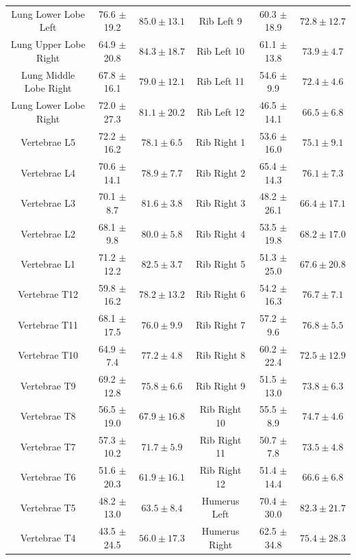 \begin{table}[t!]
{{\begin{tabular}{cccccc}
Lung Lower Lobe Left & 76.6 $\pm$ 19.2 & $\bm{85.0 \pm 13.1}$ & Rib Left 9 & 60.3 $\pm$ 18.9 & $\bm{72.8 \pm 12.7}$ \\
Lung Upper Lobe Right & 64.9 $\pm$ 20.8 & $\bm{84.3 \pm 18.7}$ & Rib Left 10 & 61.1 $\pm$ 13.8 & $\bm{73.9 \pm 4.7}$ \\
Lung Middle Lobe Right & 67.8 $\pm$ 16.1 & $\bm{79.0 \pm 12.1}$ & Rib Left 11 & 54.6 $\pm$ 9.9 & $\bm{72.4 \pm 4.6}$ \\
Lung Lower Lobe Right & 72.0 $\pm$ 27.3 & $\bm{81.1 \pm 20.2}$ & Rib Left 12 & 46.5 $\pm$ 14.1 & $\bm{66.5 \pm 6.8}$ \\
Vertebrae L5 & 72.2 $\pm$ 16.2 & $\bm{78.1 \pm 6.5}$ & Rib Right 1 & 53.6 $\pm$ 16.0 & $\bm{75.1 \pm 9.1}$ \\
Vertebrae L4 & 70.6 $\pm$ 14.1 & $\bm{78.9 \pm 7.7}$ & Rib Right 2 & 65.4 $\pm$ 14.3 & $\bm{76.1 \pm 7.3}$ \\
Vertebrae L3 & 70.1 $\pm$ 8.7 & $\bm{81.6 \pm 3.8}$ & Rib Right 3 & 48.2 $\pm$ 26.1 & $\bm{66.4 \pm 17.1}$ \\
Vertebrae L2 & 68.1 $\pm$ 9.8 & $\bm{80.0 \pm 5.8}$ & Rib Right 4 & 53.5 $\pm$ 19.8 & $\bm{68.2 \pm 17.0}$ \\
Vertebrae L1 & 71.2 $\pm$ 12.2 & $\bm{82.5 \pm 3.7}$ & Rib Right 5 & 51.3 $\pm$ 25.0 & $\bm{67.6 \pm 20.8}$ \\
Vertebrae T12 & 59.8 $\pm$ 16.2 & $\bm{78.2 \pm 13.2}$ & Rib Right 6 & 54.2 $\pm$ 16.3 & $\bm{76.7 \pm 7.1}$ \\
Vertebrae T11 & 68.1 $\pm$ 17.5 & $\bm{76.0 \pm 9.9}$ & Rib Right 7 & 57.2 $\pm$ 9.6 & $\bm{76.8 \pm 5.5}$ \\
Vertebrae T10 & 64.9 $\pm$ 7.4 & $\bm{77.2 \pm 4.8}$ & Rib Right 8 & 60.2 $\pm$ 22.4 & $\bm{72.5 \pm 12.9}$ \\
Vertebrae T9 & 69.2 $\pm$ 12.8 & $\bm{75.8 \pm 6.6}$ & Rib Right 9 & 51.5 $\pm$ 13.0 & $\bm{73.8 \pm 6.3}$ \\
Vertebrae T8 & 56.5 $\pm$ 19.0 & $\bm{67.9 \pm 16.8}$ & Rib Right 10 & 55.5 $\pm$ 8.9 & $\bm{74.7 \pm 4.6}$ \\
Vertebrae T7 & 57.3 $\pm$ 10.2 & $\bm{71.7 \pm 5.9}$ & Rib Right 11 & 50.7 $\pm$ 7.8 & $\bm{73.5 \pm 4.8}$ \\
Vertebrae T6 & 51.6 $\pm$ 20.3 & $\bm{61.9 \pm 16.1}$ & Rib Right 12 & 51.4 $\pm$ 14.4 & $\bm{66.6 \pm 6.8}$ \\
Vertebrae T5 & 48.2 $\pm$ 13.0 & $\bm{63.5 \pm 8.4}$ & Humerus Left & 70.4 $\pm$ 30.0 & $\bm{82.3 \pm 21.7}$ \\
Vertebrae T4 & 43.5 $\pm$ 24.5 & $\bm{56.0 \pm 17.3}$ & Humerus Right & 62.5 $\pm$ 34.8 & $\bm{75.4 \pm 28.3}$ \\

\end{tabular}}}
\end{table}
